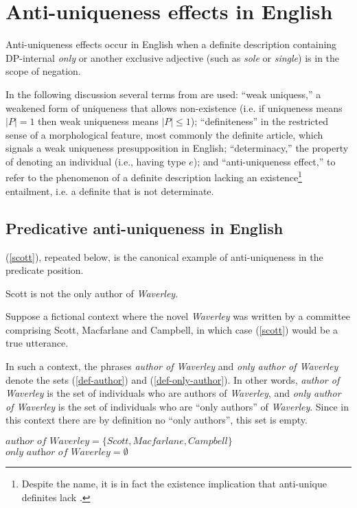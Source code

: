 \section{Anti-uniqueness effects in English \label{sec:anti-uniqueness-english}}
Anti-uniqueness effects occur in English when a definite description containing DP-internal \textit{only} or another exclusive adjective (such as \textit{sole} or \textit{single}) is in the scope of negation.

In the following discussion several terms from \citet{cb2015} are used: ``weak uniquess,'' a weakened form of uniqueness that allows non-existence (i.e. if uniqueness means $|P| = 1$ then weak uniqueness means $|P| \le 1$); ``definiteness'' in the restricted sense of a morphological feature, most commonly the definite article, which signals a weak uniqueness presupposition in English; ``determinacy,'' the property of denoting an individual (i.e., having type $e$); and ``anti-uniqueness effect,'' to refer to the phenomenon of a definite description lacking an existence\footnote{Despite the name, it is in fact the existence implication that anti-unique definites lack \citep[p. 385]{cb2015}.} entailment, i.e. a definite that is not determinate.

\subsection{Predicative anti-uniqueness in English}
(\ref{scott}), repeated below, is the canonical example of anti-uniqueness in the predicate position.

\begin{exe}
	 Scott is not the only author of \textit{Waverley}.
\end{exe}

Suppose a fictional context where the novel \textit{Waverley} was written by a committee comprising Scott, Macfarlane and Campbell, in which case (\ref{scott}) would be a true utterance.

In such a context, the phrases \textit{author of Waverley} and \textit{only author of Waverley} denote the sets (\ref{def-author}) and (\ref{def-only-author}). In other words, \textit{author of Waverley} is the set of individuals who are authors of \textit{Waverley}, and \textit{only author of Waverley} is the set of individuals who are ``only authors'' of \textit{Waverley}. Since in this context there are by definition no ``only authors'', this set is empty.

\begin{exe}
	\ex \label{def-author} $\textit{author of Waverley} = \lbrace Scott, Macfarlane, Campbell \rbrace$
	\ex \label{def-only-author} $\textit{only author of Waverley} = \emptyset$
\end{exe}

